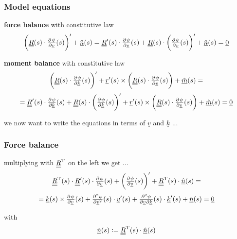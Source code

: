 \begin{frame}
  \frametitle{Model equations}
  
  \textbf{force balance} with constitutive law
  \begin{displaymath}
    \biggl( \doubleunderline{R}(s) \cdot \pd{\psi}{\underline{v}}(s) \biggr)^{\prime} + \underline{\hat{n}}(s) = 
    \doubleunderline{R}^{\prime}(s) \cdot \pd{\psi}{\underline{v}}(s) +
    \doubleunderline{R}(s) \cdot \biggl( \pd{\psi}{\underline{v}}(s) \biggr)^{\prime} +
    \underline{\hat{n}}(s) =
    \underline{0}
  \end{displaymath}
  
  \vspace{1em}
  \textbf{moment balance} with constitutive law
  \begin{displaymath}
    \biggl( \doubleunderline{R}(s) \cdot \pd{\psi}{\underline{k}}(s) \biggr)^{\prime} +
    \underline{r}^{\prime}(s) \times \biggl( \doubleunderline{R}(s) \cdot \pd{\psi}{\underline{v}}(s) \biggr) +
    \underline{\hat{m}}(s) =
  \end{displaymath}
  \begin{displaymath}
    = 
    \doubleunderline{R}^{\prime}(s) \cdot \pd{\psi}{\underline{k}}(s) +
    \doubleunderline{R}(s) \cdot \biggl( \pd{\psi}{\underline{k}}(s) \biggr)^{\prime} +
    \underline{r}^{\prime}(s) \times \biggl( \doubleunderline{R}(s) \cdot \pd{\psi}{\underline{v}}(s) \biggr) +
    \underline{\hat{m}}(s) =
    \underline{0}
  \end{displaymath}
  
  \vspace{1em}
  we now want to write the equations in terms of $\underline{v}$ and $\underline{k}$ ...
\end{frame}


\begin{frame}
  \frametitle{Force balance}
  multiplying with $\underline{\underline{R}}^{\mathrm{T}}$ on the left we get ...
  \begin{displaymath}
    \doubleunderline{R}^{\mathrm{T}}(s) \cdot
    \doubleunderline{R}^{\prime}(s) \cdot \pd{\psi}{\underline{v}}(s) +
    \biggl( \pd{\psi}{\underline{v}}(s) \biggr)^{\prime} +
    \doubleunderline{R}^{\mathrm{T}}(s) \cdot \underline{\hat{n}}(s) =
  \end{displaymath}
  \begin{displaymath}
    = \underline{k}(s) \times \pd{\psi}{\underline{v}}(s) +
    \pd[2]{\psi}{\underline{v}}(s) \cdot \underline{v}^{\prime}(s) +
    \md{\psi}{2}{\underline{v}}{}{\underline{k}}{}(s) \cdot \underline{k}^{\prime}(s) +
    \underline{\tilde{n}}(s) =
    \underline{0}
  \end{displaymath}
  
  with
  \begin{displaymath}
    \underline{\tilde{n}}(s) :=
    \underline{\underline{R}}^{\mathrm{T}}(s) \cdot \underline{\hat{n}}(s)
  \end{displaymath}
\end{frame}


